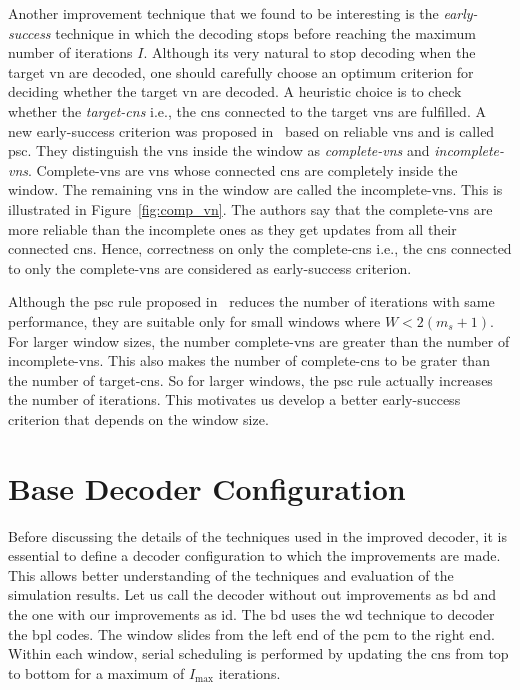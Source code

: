Another improvement technique that we found to be interesting is the \emph{early-success} technique in which the decoding stops before reaching the maximum number of iterations $I$. Although its very natural to stop decoding when the target \gls{vn} are decoded, one should carefully choose an optimum criterion for deciding whether the target \gls{vn} are decoded. A heuristic choice is to check whether the \emph{target-\glspl{cn}} i.e., the \glspl{cn} connected to the target \glspl{vn} are fulfilled. A new early-success criterion was proposed in~\cite{Kang2018} based on reliable \glspl{vn} and is called \gls{psc}. They distinguish the \glspl{vn} inside the window as \emph{complete-\glspl{vn}} and \emph{incomplete-\glspl{vn}}. Complete-\glspl{vn} are \glspl{vn} whose connected \glspl{cn} are completely inside the window. The remaining \glspl{vn} in the window are called the incomplete-\glspl{vn}. This is illustrated in Figure~\ref{fig:comp_vn}. The authors say that the complete-\glspl{vn} are more reliable than the incomplete ones as they get updates from all their connected \glspl{cn}. Hence, correctness on only the complete-\glspl{cn} i.e., the \glspl{cn} connected to only the complete-\glspl{vn} are considered as early-success criterion.

Although the \gls{psc} rule proposed in~\cite{Kang2018} reduces the number of iterations with same performance, they are suitable only for small windows where $W<2(m_s+1)$. For larger window sizes, the number complete-\glspl{vn} are greater than the number of incomplete-\glspl{vn}. This also makes the number of complete-\glspl{cn} to be grater than the number of target-\glspl{cn}. So for larger windows, the \gls{psc} rule actually increases the number of iterations. This motivates us develop a better early-success criterion that depends on the window size.

\section{Base Decoder Configuration}
Before discussing the details of the techniques used in the improved decoder, it is essential to define a decoder configuration to which the improvements are made. This allows better understanding of the techniques and evaluation of the simulation results. Let us call the decoder without out improvements as \gls{bd} and the one with our improvements as \gls{id}. The \gls{bd} uses the \gls{wd} technique to decoder the \gls{bpl} codes. The window slides from the left end of the \gls{pcm} to the right end. Within each window, serial scheduling is performed by updating the \glspl{cn} from top to bottom for a maximum of $I_{\text{max}}$ iterations.


